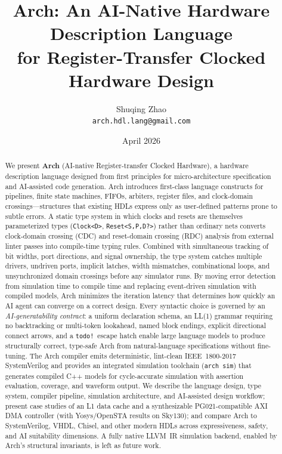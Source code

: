 \documentclass[11pt,twocolumn]{article}
\title{\textbf{Arch: An AI-Native Hardware Description Language\\for Register-Transfer Clocked Hardware Design}}
\author{
  Shuqing Zhao \\
  \texttt{arch.hdl.lang@gmail.com}
}
\date{April 2026}
\begin{document}
\maketitle

\begin{abstract}
We present \textbf{Arch} (AI-native Register-transfer Clocked Hardware), a hardware description language designed from first principles for micro-architecture specification and AI-assisted code generation.
Arch introduces first-class language constructs for pipelines, finite state machines, FIFOs, arbiters, register files, and clock-domain crossings---structures that existing HDLs express only as user-defined patterns prone to subtle errors.
A static type system in which clocks and resets are themselves parameterized types (\texttt{Clock<D>}, \texttt{Reset<S,P,D?>}) rather than ordinary nets converts clock-domain crossing (CDC) and reset-domain crossing (RDC) analysis from external linter passes into compile-time typing rules. Combined with simultaneous tracking of bit widths, port directions, and signal ownership, the type system catches multiple drivers, undriven ports, implicit latches, width mismatches, combinational loops, and unsynchronized domain crossings before any simulator runs.
By moving error detection from simulation time to compile time and replacing event-driven simulation with compiled models, Arch minimizes the iteration latency that determines how quickly an AI agent can converge on a correct design.
Every syntactic choice is governed by an \emph{AI-generatability contract}: a uniform declaration schema, an LL(1) grammar requiring no backtracking or multi-token lookahead, named block endings, explicit directional connect arrows, and a \texttt{todo!}\ escape hatch enable large language models to produce structurally correct, type-safe Arch from natural-language specifications without fine-tuning.
The Arch compiler emits deterministic, lint-clean IEEE~1800-2017 SystemVerilog and provides an integrated simulation toolchain (\texttt{arch sim}) that generates compiled C++ models for cycle-accurate simulation with assertion evaluation, coverage, and waveform output.
We describe the language design, type system, compiler pipeline, simulation architecture, and AI-assisted design workflow; present case studies of an L1 data cache and a synthesizable PG021-compatible AXI DMA controller (with Yosys/OpenSTA results on Sky130); and compare Arch to SystemVerilog, VHDL, Chisel, and other modern HDLs across expressiveness, safety, and AI suitability dimensions. A fully native LLVM~IR simulation backend, enabled by Arch's structural invariants, is left as future work.
\end{abstract}
\end{document}
